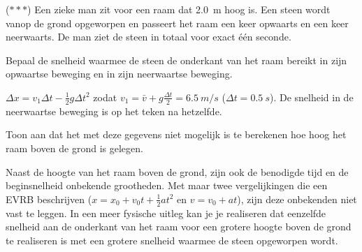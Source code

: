 \documentclass{ximera}
\begin{document}
\begin{exercise}
    ($\ast\ast\ast$) Een zieke man zit voor een raam dat \SI{2,0}{m} hoog is. Een steen wordt vanop de grond opgeworpen en passeert het raam een keer opwaarts en een keer neerwaarts. De man ziet de steen in totaal voor exact één seconde.%

    \begin{question} Bepaal de snelheid waarmee de steen de onderkant van het raam bereikt in zijn opwaartse beweging en in zijn neerwaartse beweging.
        \begin{oplossing} $\Delta x= v_1\Delta t-\frac{1}{2}g\Delta t^2$ zodat $v_1=\bar{v}+g\frac{\Delta t}{2}=\SI{6,5}{m/s}$ ($\Delta t = \SI{0,5}{s}$). De snelheid in de neerwaartse beweging is op het teken na hetzelfde.
        \end{oplossing} 
    \end{question} %
    
    \begin{question} Toon aan dat het met deze gegevens niet mogelijk is te berekenen hoe hoog het raam boven de grond is gelegen. 
        \begin{oplossing} Naast de hoogte van het raam boven de grond, zijn ook de benodigde tijd en de beginsnelheid onbekende grootheden. Met maar twee vergelijkingen die een EVRB beschrijven ($x=x_0+v_0t+\frac{1}{2}at^2$ en $v=v_0+at$), zijn deze onbekenden niet vast te leggen. 
        In een meer fysische uitleg kan je je realiseren dat eenzelfde snelheid aan de onderkant van het raam voor een grotere hoogte boven de grond te realiseren is met een grotere snelheid waarmee de steen opgeworpen wordt. 
        \end{oplossing} 
    \end{question} 
\end{exercise}
\end{document}

